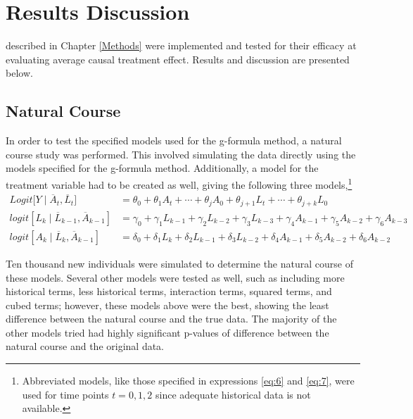 
\chapter{Results Discussion} \label{Results}

 described in Chapter \ref{Methods} were implemented and tested for their efficacy at evaluating average causal treatment effect.  Results and discussion are presented below.  

\section{Natural Course} \label{nattycourse}
In order to test the specified models used for the g-formula method, a natural course study was performed.  This involved simulating the data directly using the models specified for the g-formula method.  Additionally, a model for the treatment variable had to be created as well, giving the following three models,\footnote{Abbreviated models, like those specified in expressions \ref{eq:6} and \ref{eq:7}, were used for time points $t=0,1,2$ since adequate historical data is not available.} 
\begin{align} 
Logit \big[Y \mid \overline{A}_t, \overline{L}_t \big] &= \theta_{0} + \theta_1 A_{t} + \cdots + \theta_j A_0 + \theta_{j+1} L_t + \cdots + \theta_{j+k} L_0  \label{eq:12} \\ 
logit[L_k \mid \overline{L}_{k-1}, \overline{A}_{k-1}] &= \gamma_0 + \gamma_1 L_{k-1} + \gamma_2 L_{k-2} + \gamma_3 L_{k-3}  + \gamma_4 A_{k-1} + \gamma_5 A_{k-2} + \gamma_6 A_{k-3} \label{eq:13} \\ 
logit[A_k \mid \overline{L}_{k}, \overline{A}_{k-1}] &= \delta_0 + \delta_1 L_{k} + \delta_2 L_{k-1} + \delta_3 L_{k-2}  + \delta_4 A_{k-1} + \delta_5 A_{k-2} + \delta_6 A_{k-2} \label{eq:14}
\end{align} 

Ten thousand new individuals were simulated to determine the natural course of these models.  Several other models were tested as well, such as including more historical terms, less historical terms, interaction terms, squared terms, and cubed terms; however, these models above were the best, showing the least difference between the natural course and the true data.  The majority of the other models tried had highly significant p-values of difference between the natural course and the original data.  

